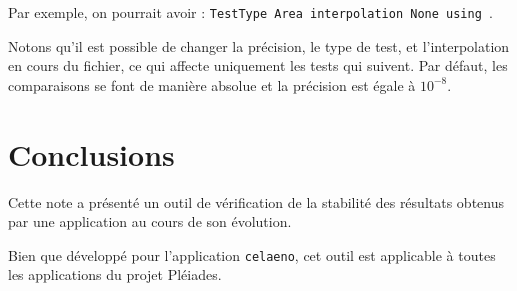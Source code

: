 \documentclass[a4paper,12pt]{article}
\newcommand{\celaeno}{{\tt celaeno}}
\newcommand{\tfel}{Pléiades}
\begin{document}
Par exemple, on pourrait avoir : {\tt TestType Area interpolation None using }.

Notons qu'il est possible de changer la précision, le type de test, et l'interpolation
en cours du fichier, ce qui affecte uniquement les tests qui suivent.
Par défaut, les comparaisons se font de manière absolue et la
précision est égale à $10^{-8}$.

\newpage
\section{Conclusions}

Cette note a présenté un outil de vérification de la stabilité des
résultats obtenus par une application au cours de son évolution.

Bien que développé pour l'application \celaeno{}, cet outil est
applicable à toutes les applications du projet \tfel{}.

\clearpage
\newpage

\listoffigures

\end{document}
